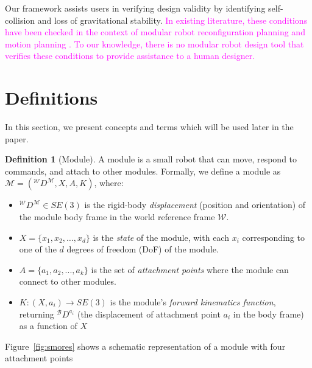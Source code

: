 \documentclass[conference]{IEEEtran}
\theoremstyle{definition}
\newtheorem{definition}{Definition}[section]
\newcommand{\abt}[1]{\textcolor{magenta}{#1}}
\begin{document}
Our framework assists users in verifying design validity by identifying self-collision
and loss of gravitational stability. \abt{In existing literature, these conditions have
been checked in the context of modular robot reconfiguration planning \cite{casal2001reconfiguration} and motion
planning \cite{yoshida2002self}.
To our knowledge, there is no modular robot design tool that verifies
these conditions to provide assistance to a human designer.}

\section{Definitions}
\label{sec:preliminaries}
In this section, we present concepts and terms which will be used later in the paper.

\begin{definition}[Module] A module is a small robot that can move, respond to commands,
and attach to other modules.  Formally, we define a  module  as $\mathcal{M}=({^\mathcal{W}}D^{\mathcal{M}}, X, A,
K)$, where:
\begin{itemize}
\item ${^\mathcal{W}}D^{\mathcal{M}}\in SE(3)$ is the rigid-body \textit{displacement} (position and orientation)
of the module body frame in the world reference frame $\mathcal{W}$. 
\item \(X=\lbrace x_1, x_2, \ldots, x_d \rbrace\) is the \textit{state} of the module,
with each \(x_i\) corresponding to one of the \(d\) degrees of freedom (DoF) of the module.
\item $A=\{a_1, a_2, ..., a_k\}$ is the set of \textit{attachment points} where the module can connect to other modules.
\item \(K: (X, a_i) \rightarrow SE(3) \) is the module's \textit{forward kinematics function}, returning \({^\mathcal{B}}D^{a_{i}}\) (the displacement of attachment point \(a_i\)
in the body frame) as a function of \(X\)  \end{itemize}

Figure~\ref{fig:smores} shows a schematic representation of a module with  four attachment points
\end{definition}
\end{document}
